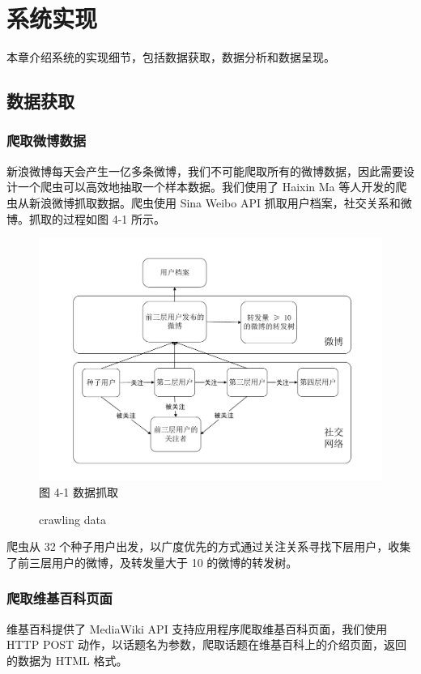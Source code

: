 \chapter{系统实现}
\thispagestyle{fancy}
本章介绍系统的实现细节，包括数据获取，数据分析和数据呈现。

\section{数据获取}
\subsection{爬取微博数据}
新浪微博每天会产生一亿多条微博\cite{CN12}，我们不可能爬取所有的微博数据，因此需要设计一个爬虫可以高效地抽取一个样本数据。我们使用了 Haixin Ma 等人\cite{haixin13}开发的爬虫从新浪微博抓取数据。爬虫使用 Sina Weibo API 抓取用户档案，社交关系和微博。抓取的过程如图 4-1 所示。
\begin{figure}[!h]
\centering
\includegraphics[width=\textwidth]{crawler}
图 4-1 数据抓取
\caption{crawling data}
\end{figure}

爬虫从 32 个种子用户出发，以广度优先的方式通过关注关系寻找下层用户，收集了前三层用户的微博，及转发量大于 10 的微博的转发树。

\subsection{爬取维基百科页面}
维基百科提供了 MediaWiki API 支持应用程序爬取维基百科页面，我们使用 HTTP POST\cite{http} 动作，以话题名为参数，爬取话题在维基百科上的介绍页面，返回的数据为 HTML 格式。


